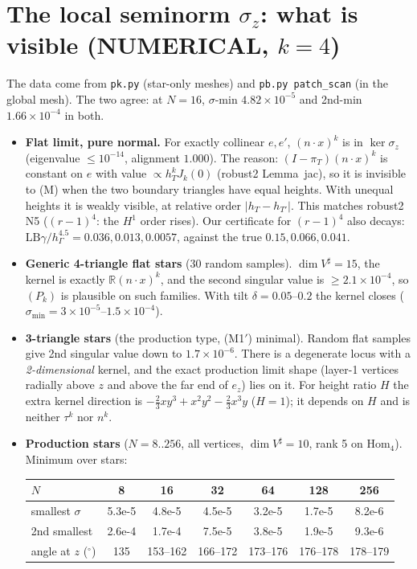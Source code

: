 \documentclass[11pt]{article}
\theoremstyle{remark}
\newcommand{\hG}{h_\Gamma}
\begin{document}
\section{The local seminorm $\sigma_z$: what is visible (NUMERICAL, $k=4$)}
The data come from \texttt{pk.py} (star-only meshes) and \texttt{pb.py patch\_scan} (in the global mesh). The two agree: at
$N=16$, $\sigma$-min $4.82\times10^{-5}$ and 2nd-min $1.66\times10^{-4}$ in both.
\begin{itemize}
\item \textbf{Flat limit, pure normal.} For exactly collinear $e,e'$, $(n\cdot x)^k$ is in $\ker\sigma_z$ (eigenvalue $\le10^{-14}$,
alignment $1.000$). The reason: $(I-\pi_T)(n\cdot x)^k$ is constant on $e$ with value $\propto h_T^kJ_k(0)$ (robust2
Lemma~jac), so it is invisible to (M) when the two boundary triangles have equal heights. With unequal heights it is weakly
visible, at relative order $|h_T-h_{T'}|$. This matches robust2 N5 ($(r-1)^4$: the $H^1$ order rises). Our certificate for
$(r-1)^4$ also decays: $\mathrm{LB}\gamma/\hG^{4.5}=0.036,0.013,0.0057$, against the true $0.15,0.066,0.041$.
\item \textbf{Generic 4-triangle flat stars} (30 random samples). $\dim V^\sharp=15$, the kernel is exactly
$\mathbb R(n\cdot x)^k$, and the second singular value is $\ge2.1\times10^{-4}$, so $(P_k)$ is plausible on such families. With
tilt $\delta=0.05$--$0.2$ the kernel closes ($\sigma_{\min}=3\times10^{-5}$--$1.5\times10^{-4}$).
\item \textbf{3-triangle stars} (the production type, (M1$'$) minimal). Random flat samples give 2nd singular value down to
$1.7\times10^{-6}$. There is a degenerate locus with a \emph{2-dimensional} kernel, and the exact production limit shape (layer-1
vertices radially above $z$ and above the far end of $e_z$) lies on it. For height ratio $H$ the extra kernel direction is
$-\tfrac23xy^3+x^2y^2-\tfrac23x^3y$ ($H=1$); it depends on $H$ and is neither $\tau^k$ nor $n^k$.
\item \textbf{Production stars} ($N=8..256$, all vertices, $\dim V^\sharp=10$, rank 5 on $\mathrm{Hom}_4$). Minimum over stars:

\smallskip
\begin{tabular}{lcccccc}\toprule
$N$ & 8 & 16 & 32 & 64 & 128 & 256\\\midrule
smallest $\sigma$ & 5.3e-5 & 4.8e-5 & 4.5e-5 & 3.2e-5 & 1.7e-5 & 8.2e-6\\
2nd smallest & 2.6e-4 & 1.7e-4 & 7.5e-5 & 3.8e-5 & 1.9e-5 & 9.3e-6\\
angle at $z$ ($^\circ$) & 135 & 153--162 & 166--172 & 173--176 & 176--178 & 178--179\\\bottomrule
\end{tabular}
\smallskip


\end{itemize}
\end{document}
